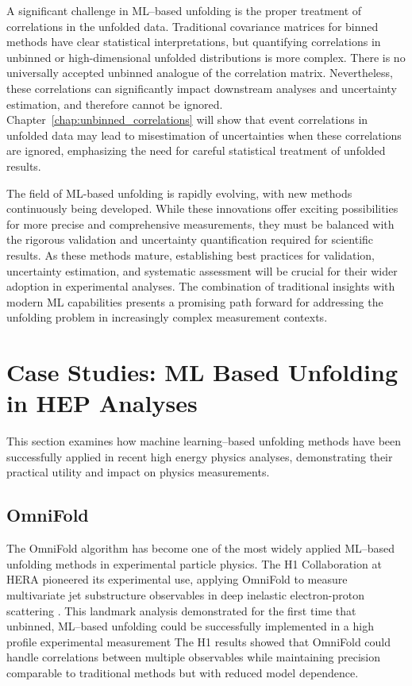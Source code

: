     A significant challenge in ML--based unfolding is the proper treatment of correlations in the unfolded data.
    Traditional covariance matrices for binned methods have clear statistical interpretations, but quantifying correlations in unbinned or high-dimensional unfolded distributions is more complex.
    There is no universally accepted unbinned analogue of the correlation matrix.
    Nevertheless, these correlations can significantly impact downstream analyses and uncertainty estimation, and therefore cannot be ignored.
    Chapter~\ref{chap:unbinned_correlations} will show that event correlations in unfolded data may lead to misestimation of uncertainties when these correlations are ignored, emphasizing the need for careful statistical treatment of unfolded results.

    The field of ML-based unfolding is rapidly evolving, with new methods continuously being developed.
    While these innovations offer exciting possibilities for more precise and comprehensive measurements, they must be balanced with the rigorous validation and uncertainty quantification required for scientific results.
    As these methods mature, establishing best practices for validation, uncertainty estimation, and systematic assessment will be crucial for their wider adoption in experimental analyses.
    The combination of traditional insights with modern ML capabilities presents a promising path forward for addressing the unfolding problem in increasingly complex measurement contexts.

\section{Case Studies: ML Based Unfolding in HEP Analyses}

This section examines how machine learning--based unfolding methods have been successfully applied in recent high energy physics analyses, demonstrating their practical utility and impact on physics measurements.

\subsection{OmniFold}  
    The OmniFold algorithm has become one of the most widely applied ML--based unfolding methods in experimental particle physics.
    The H1 Collaboration at HERA pioneered its experimental use, applying OmniFold to measure multivariate jet substructure observables in deep inelastic electron-proton scattering .
    This landmark analysis demonstrated for the first time that unbinned, ML--based unfolding could be successfully implemented in a high profile experimental measurement
    The H1 results showed that OmniFold could handle correlations between multiple observables while maintaining precision comparable to traditional methods but with reduced model dependence.

